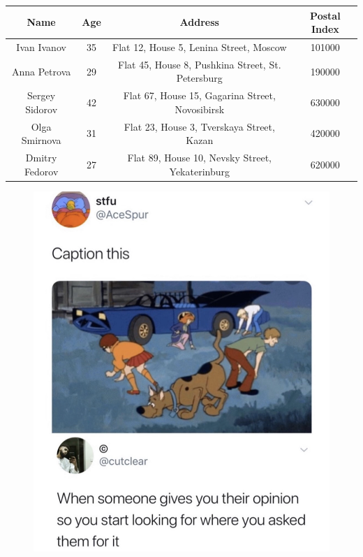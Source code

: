 \documentclass{article}
\begin{document}
\begin{tabular}{ | c | c | c | c | }
\hline
Name & Age & Address & Postal Index \\
\hline
Ivan Ivanov & 35 & Flat 12, House 5, Lenina Street, Moscow & 101000 \\
\hline
Anna Petrova & 29 & Flat 45, House 8, Pushkina Street, St. Petersburg & 190000 \\
\hline
Sergey Sidorov & 42 & Flat 67, House 15, Gagarina Street, Novosibirsk & 630000 \\
\hline
Olga Smirnova & 31 & Flat 23, House 3, Tverskaya Street, Kazan & 420000 \\
\hline
Dmitry Fedorov & 27 & Flat 89, House 10, Nevsky Street, Yekaterinburg & 620000 \\
\hline
\end{tabular}
\begin{figure}
\includegraphics[width=\linewidth]{opinion.png}
\end{figure}
\end{document}
